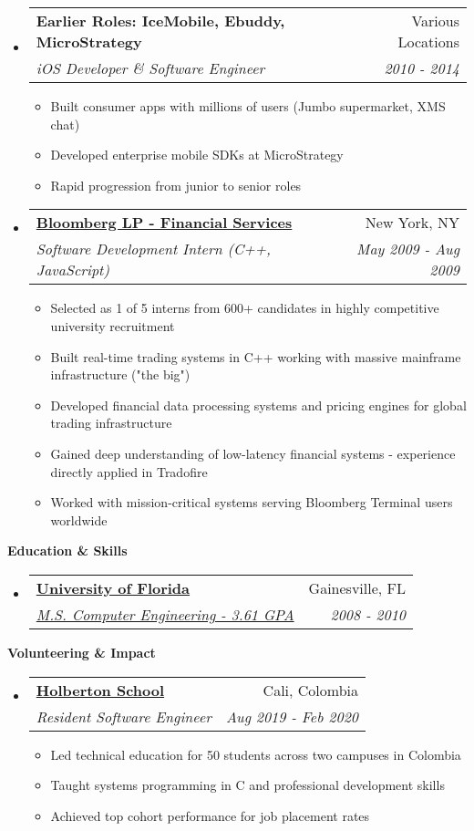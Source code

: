 \documentclass[letterpaper,11pt]{article}
\makeatletter
\newcommand{\resitem}[1]{\item #1 \vspace{-2pt}}
\newcommand{\resheading}[1]{{\large \colorbox{mygrey}{\begin{minipage}{\textwidth}{\textbf{#1 \vphantom{p\^{E}}}}\end{minipage}}}}
\newcommand{\ressubheading}[4]{
\begin{tabular*}{7.0in}{l@{\extracolsep{\fill}}r}
    \textbf{#1} & #2 \\
    \textit{#3} & \textit{#4} \\
\end{tabular*}\vspace{-6pt}}
\makeatother
\begin{document}
\begin{itemize}
\item
    \ressubheading{Earlier Roles: IceMobile, Ebuddy, MicroStrategy}{Various Locations}{iOS Developer \& Software Engineer}{2010 - 2014}
    \begin{itemize}
        \resitem{Built consumer apps with millions of users (Jumbo supermarket, XMS chat)}
        \resitem{Developed enterprise mobile SDKs at MicroStrategy}
        \resitem{Rapid progression from junior to senior roles}
    \end{itemize}
    
\item
    \ressubheading{\href{http://www.bloomberg.com}{Bloomberg LP - Financial Services}}{New York, NY}{Software Development Intern (C++, JavaScript)}{May 2009 - Aug 2009}
    \begin{itemize}
      \resitem{Selected as 1 of 5 interns from 600+ candidates in highly competitive university recruitment}
      \resitem{Built real-time trading systems in C++ working with massive mainframe infrastructure ("the big")}
      \resitem{Developed financial data processing systems and pricing engines for global trading infrastructure}
      \resitem{Gained deep understanding of low-latency financial systems - experience directly applied in Tradofire}
      \resitem{Worked with mission-critical systems serving Bloomberg Terminal users worldwide}
    \end{itemize}

\end{itemize}

\vspace{0.2in}
  
\resheading{Education \& Skills}
\begin{itemize}
\item
    \ressubheading{\href{https://bit.ly/4a2uloZ}{University of Florida}}{Gainesville, FL}{\href{https://bit.ly/4a2uloZ}{M.S. Computer Engineering - 3.61 GPA}}{2008 - 2010}
\end{itemize}

\vspace{0.2in}

\resheading{Volunteering \& Impact}
\begin{itemize}
\item
    \ressubheading{\href{https://www.holbertonschool.com/}{Holberton School}}{Cali, Colombia}{Resident Software Engineer}{Aug 2019 - Feb 2020}
    \begin{itemize}
        \resitem{Led technical education for 50 students across two campuses in Colombia}
        \resitem{Taught systems programming in C and professional development skills}
        \resitem{Achieved top cohort performance for job placement rates}
    \end{itemize}
\end{itemize}
\end{document}
